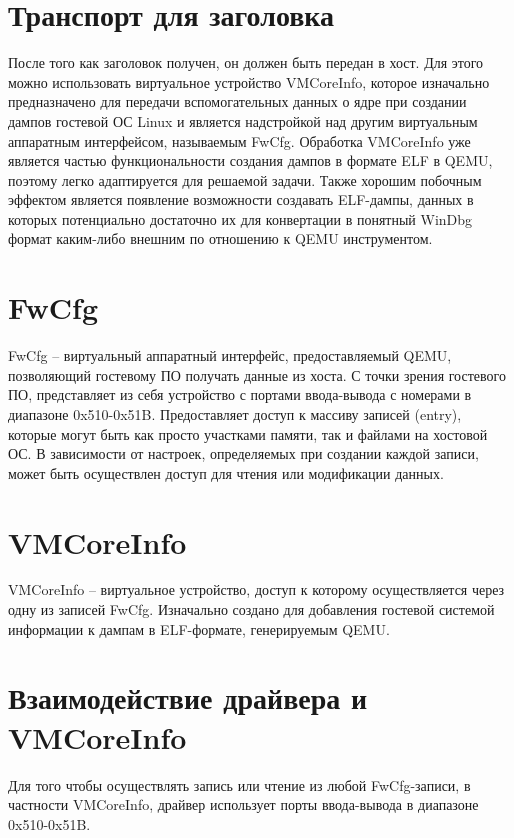 \documentclass{mipt-thesis-bs}
\begin{document}
\section*{Транспорт для заголовка}

После того как заголовок получен, он должен быть передан в хост. Для этого можно использовать виртуальное устройство VMCoreInfo, которое изначально предназначено для передачи вспомогательных данных о ядре при создании дампов гостевой ОС Linux и является надстройкой над другим виртуальным аппаратным интерфейсом, называемым FwCfg. Обработка VMCoreInfo уже является частью функциональности создания дампов в формате ELF в QEMU, поэтому легко адаптируется для решаемой задачи. Также хорошим побочным эффектом является появление возможности создавать ELF-дампы, данных в которых потенциально достаточно их для конвертации в понятный WinDbg формат каким-либо внешним по отношению к QEMU инструментом.

\section*{FwCfg}

FwCfg -- виртуальный аппаратный интерфейс, предоставляемый QEMU, позволяющий гостевому ПО получать данные из хоста. С точки зрения гостевого ПО, представляет из себя устройство с портами ввода-вывода с номерами в диапазоне 0x510-0x51B. Предоставляет доступ к массиву записей (entry), которые могут быть как просто участками памяти, так и файлами на хостовой ОС. В зависимости от настроек, определяемых при создании каждой записи, может быть осуществлен доступ для чтения или модификации данных.

\section*{VMCoreInfo}

VMCoreInfo -- виртуальное устройство, доступ к которому осуществляется через одну из записей FwCfg. Изначально создано для добавления гостевой системой информации к дампам в ELF-формате, генерируемым QEMU.

\section*{Взаимодействие драйвера и VMCoreInfo}

Для того чтобы осуществлять запись или чтение из любой FwCfg-записи, в частности VMCoreInfo, драйвер использует порты ввода-вывода в диапазоне 0x510-0x51B.
\end{document}
